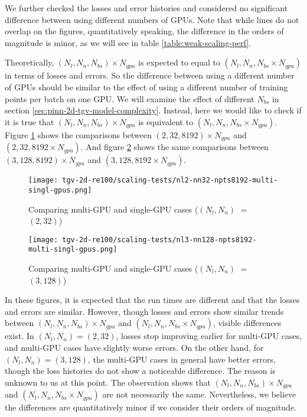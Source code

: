 We further checked the losses and error histories and considered no significant difference between using different numbers of GPUs.
Note that while lines do not overlap on the figures, quantitatively speaking, the difference in the orders of magnitude is minor, as we will see in table \ref{table:weak-scaling-perf}. 

Theoretically, $(N_l, N_n, N_{bs})\times N_{gpu}$ is expected to equal to $(N_l, N_n, N_{bs}\times N_{gpu})$ in terms of losses and errors.
So the difference between using a different number of GPUs should be similar to the effect of using a different number of training points per batch on one GPU.
We will examine the effect of different $N_{bs}$ in section \ref{sec:pinn-2d-tgv-model-complexity}.
Instead, here we would like to check if it is true that $(N_l, N_n, N_{bs})\times N_{gpu}$ is equivalent to $(N_l, N_n, N_{bs}\times N_{gpu})$.
Figure \ref{fig:nl2-nn32-npts8192-multi-singl-gpus} shows the comparisons between $(2, 32, 8192)\times N_{gpu}$ and $(2, 32, 8192\times N_{gpu})$.
And figure \ref{fig:nl3-nn128-npts8192-multi-singl-gpus} shows the same comparisons between $(3, 128, 8192)\times N_{gpu}$ and $(3, 128, 8192\times N_{gpu})$.

\begin{figure}[hbt!]
    \centering%
    \texttt{[image: tgv-2d-re100/scaling-tests/nl2-nn32-npts8192-multi-singl-gpus.png]}
    \caption[%
        Comparing multi-GPU and single-GPU cases ($(N_l, N_n)$ $=$ $(2, 32)$)%
    ]{%
        Comparing multi-GPU and single-GPU cases ($(N_l, N_n)$ $=$ $(2, 32)$)%
    }\label{fig:nl2-nn32-npts8192-multi-singl-gpus}
\end{figure}

\begin{figure}[hbt!]
    \centering%
    \texttt{[image: tgv-2d-re100/scaling-tests/nl3-nn128-npts8192-multi-singl-gpus.png]}
    \caption[%
        Comparing multi-GPU and single-GPU cases ($(N_l, N_n)$ $=$ $(3, 128)$)%
    ]{%
        Comparing multi-GPU and single-GPU cases ($(N_l, N_n)$ $=$ $(3, 128)$)%
    }\label{fig:nl3-nn128-npts8192-multi-singl-gpus}
\end{figure}

In these figures, it is expected that the run times are different and that the losses and errors are similar.
However, though losses and errors show similar trends between $(N_l, N_n, N_{bs})\times N_{gpu}$ and $(N_l, N_n, N_{bs}\times N_{gpu})$, visible differences exist.
In $(N_l, N_n)=(2, 32)$, losses stop improving earlier for multi-GPU cases, and multi-GPU cases have slightly worse errors.
On the other hand, for $(N_l, N_n)=(3, 128)$, the multi-GPU cases in general have better errors, though the loss histories do not show a noticeable difference.
The reason is unknown to us at this point.
The observation shows that $(N_l, N_n, N_{bs})\times N_{gpu}$ and $(N_l, N_n, N_{bs}\times N_{gpu})$ are not necessarily the same.
Nevertheless, we believe the differences are quantitatively minor if we consider their orders of magnitude.

